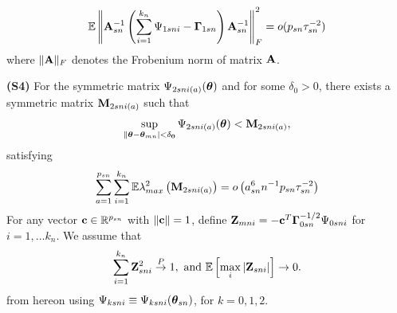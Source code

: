 
%
\begin{equation} 
{\mathbb{E}}  \left\| {\mathbf{A}}_{ s n}^{-1} 
 \left( \sum_{i = 1}^{ k_{n}} \Psi_{1 s n i} - {\boldsymbol{\Gamma}}_{1 s n } \right) 
 {\mathbf{A}}_{ s n}^{-1} \right\|_{F}^{2} = o (p_{s n} \tau_{s n}^{-2})
 \label{eq:FrobSq}
 \end{equation}
where $\|{\mathbf{A}}\|_{F}$ denotes the Frobenium norm of matrix ${\mathbf{A}}$. 
 

\noindent\textbf{(S4)}
For the symmetric matrix $\Psi_{2 s n i (a)} ({\boldsymbol{\theta}})$ and for some $\delta_{0} > 0$, there exists a symmetric matrix ${\mathbf{M}}_{2 s n i (a)}$ such that
%
\begin{align} 
\sup_{ \| {\boldsymbol{\theta}} - {\boldsymbol{\theta}}_{m n} \bf| < \delta_{0}} 
 \Psi_{2 s n i (a)} ({\boldsymbol{\theta}}) < {\mathbf{M}}_{2 s n i (a)}, 
\end{align}
%
satisfying 
%
\begin{equation}
\sum_{a = 1}^{ p_{s n}} \sum_{i = 1}^{ k_{n}} 
 {\mathbb{E}} \lambda_{max}^{2} \left( {\mathbf{M}}_{2 s n i (a)} \right) = o \left( a_{s n}^{6}  n^{-1} p_{s n}  \tau_{s n}^{-2} \right)
  \label{eq:2ndMomentBound}
\end{equation}
%
For any vector ${\bf{c}} \in {\mathbb{R}}^{ p_{s n}}$ with $\|{\bf{c}}\| = 1$, define  ${\mathbf{Z}}_{m n i} = - {\bf{c}}^{T} {\boldsymbol{\Gamma}}_{0 s n}^{-1/2} \Psi_{0 s n i}$ for $i =1, \ldots k_{n}$.  We assume that
%
 \begin{equation} 
 \sum_{i =1}^{k_{n}} {\mathbf{Z}}_{s n i}^{2} \stackrel{P}{\rightarrow} 1, 
 \text{ and } 
 {\mathbb{E}} \left[ \max_{i} | {\mathbf{Z}}_{s n i} | \right] \rightarrow 0. 
 \label{eq:CLTConditions}
\end{equation}
%
%
%
%
from hereon using $\Psi_{ k s n i} \equiv \Psi_{k s n i} ({{\boldsymbol{\theta}}}_{s n})$, for $k = 0, 1, 2$. 

